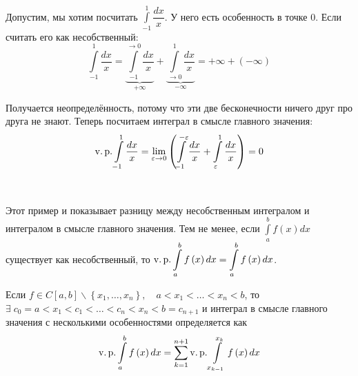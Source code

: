\documentclass[../main.tex]{subfiles}
\begin{document}
\begin{example}
    
    ~

    Допустим, мы хотим посчитать \( \displaystyle\int\limits_{ -1}^{ 1} \dfrac{ dx}{ x} \). У него есть особенность в точке 0. Если считать его как несобственный:
    \[ \displaystyle\int\limits_{ -1}^{ 1} \dfrac{ dx}{ x} = \underbrace{\displaystyle\int\limits_{ -1}^{ \rightarrow 0} \dfrac{ dx}{ x}}_{+ \infty } + \underbrace{\displaystyle\int\limits_{ \rightarrow 0}^{ 1} \dfrac{ dx}{ x}}_{- \infty }= + \infty + (- \infty ) \]

    Получается неопределённость, потому что эти две бесконечности ничего друг про друга не знают. Теперь посчитаем интеграл в смысле главного значения: 
    \[ \operatorname{v.p.} \displaystyle\int\limits_{ -1}^{ 1} \dfrac{ dx}{ x} = \lim\limits_{ \varepsilon \rightarrow 0} \left( \displaystyle\int\limits_{ -1}^{ -\varepsilon } \dfrac{ dx}{ x}  + \displaystyle\int\limits_{ \varepsilon }^{ 1} \dfrac{ dx}{ x}  \right)=0\]
\end{example}

\begin{note}
    
    ~

    Этот пример и показывает разницу между несобственным интегралом и интегралом в смысле главного значения. Тем не менее, если \( \displaystyle\int\limits_{ a}^{ b}f\left( x\right)dx \) существует как несобственный, то 
    \( \operatorname{v.p.} \displaystyle\int\limits_{ a}^{ b} f\left( x\right)dx= \displaystyle\int\limits_{ a}^{ b} f\left( x\right)dx\).
\end{note}

Если \( f \in C\left[ a,b\right] \backslash \left\{ x_1, \ldots , x_n\right\},\quad a<x_1< \ldots <x_n<b\), то \\
\( \exists \; c_0=a<x_1<c_1< \ldots <c_n<x_n<b=c_{n+1}\) и интеграл в смысле главного значения с несколькими особенностями определяется как 
\[ \operatorname{v.p.} \displaystyle\int\limits_{ a}^{ b} f\left( x\right)dx= \sum\limits_{ k=1}^{ n+1} \operatorname{v.p.} \displaystyle\int\limits_{ x_{k-1}}^{ x_k} f\left( x\right)dx\]
\end{document}
